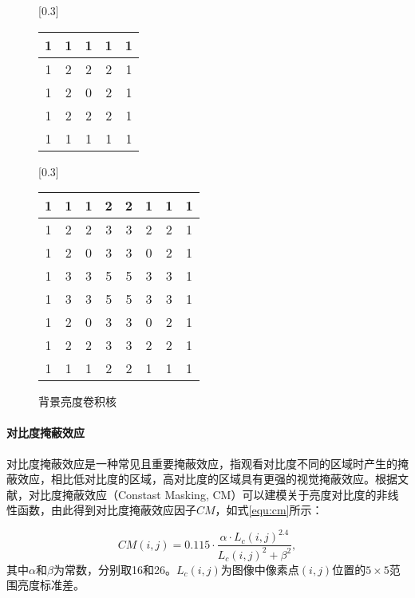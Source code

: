   \begin{figure}
    \hspace{1cm}
		[0.3\textwidth]{
			\begin{tabular}{|c|c|c|c|c|}	\hline
				1 & 1 & 1 & 1 & 1 \\ \hline
				1 & 2 & 2 & 2 & 1 \\ \hline
				1 & 2 & 0 & 2 & 1 \\ \hline
				1 & 2 & 2 & 2 & 1 \\ \hline
				1 & 1 & 1 & 1 & 1 \\ \hline
			\end{tabular}
    }
    \hspace{2cm}
    [0.3\textwidth]{
			\begin{tabular}{|c|c|c|c|c|c|c|c|}	\hline
				1& 1& 1& 2& 2& 1& 1& 1 \\ \hline
				1& 2& 2& 3& 3& 2& 2& 1 \\ \hline
				1& 2& 0& 3& 3& 0& 2& 1 \\ \hline
				1& 3& 3& 5& 5& 3& 3& 1 \\ \hline
				1& 3& 3& 5& 5& 3& 3& 1 \\ \hline
				1& 2& 0& 3& 3& 0& 2& 1 \\ \hline
				1& 2& 2& 3& 3& 2& 2& 1 \\ \hline
				1& 1& 1& 2& 2& 1& 1& 1 \\ \hline
			\end{tabular}
		}
    \caption{背景亮度卷积核}
	\end{figure}

  \paragraph{对比度掩蔽效应} 对比度掩蔽效应是一种常见且重要掩蔽效应，指观看对比度不同的区域时产生的掩蔽效应，相比低对比度的区域，高对比度的区域具有更强的视觉掩蔽效应。根据文献\cite{wuPatternMaskingEstimation2013}，对比度掩蔽效应（Constast Masking, CM）可以建模关于亮度对比度的非线性函数，由此得到对比度掩蔽效应因子$CM$，如式\ref{equ:cm}所示：

  \begin{equation} \label{equ:cm}
    CM(i, j) = 0.115 \cdot \frac{\alpha \cdot L_c(i, j)^{2.4}}{L_c(i, j)^2 + \beta^2},
  \end{equation}
  其中$\alpha$和$\beta$为常数，分别取16和26。$L_c(i, j)$为图像中像素点$(i, j)$位置的$5\times 5$范围亮度标准差。

